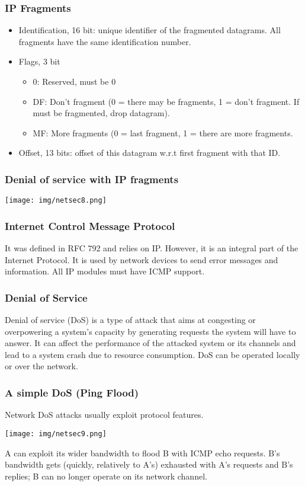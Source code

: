\documentclass[a4paper, 10pt, titlepage]{article}
\begin{document}
\subsubsection*{IP Fragments}
\begin{itemize}
\item Identification, 16 bit: unique identifier of the fragmented
datagrams. All fragments have the same identification number.
\item Flags, 3 bit
\begin{itemize}
\item 0: Reserved, must be 0
\item DF: Don’t fragment (0 = there may be fragments, 1 = don’t fragment. If must be fragmented, drop datagram).
\item MF: More fragments (0 = last fragment, 1 = there are more fragments.
\end{itemize}
\item Offset, 13 bits: offset of this datagram w.r.t first fragment
with that ID.
 \end{itemize}
 
 
\subsubsection{Denial of service with IP fragments}
\begin{center}
	\texttt{[image: img/netsec8.png]}
\end{center}

\subsubsection*{Internet Control Message Protocol}
It was defined in RFC 792 and relies on IP. However, it is an integral part of the Internet Protocol. It is used by network devices to send error messages and information. All IP modules must have ICMP support.

\subsubsection{Denial of Service}
Denial of service (DoS) is a type of attack that aims at congesting or overpowering a system’s capacity by generating requests the system will have to answer. It can affect the performance of the attacked system or its channels and lead to a system crash due to resource consumption. DoS can be operated locally or over the network.

\subsubsection*{A simple DoS (Ping Flood)}
Network DoS attacks usually exploit protocol features.
\begin{center}
	\texttt{[image: img/netsec9.png]}
\end{center}
A can exploit its wider bandwidth to flood B with ICMP echo requests. B’s bandwidth gets (quickly, relatively to A’s) exhausted with A’s requests and B’s replies; B can no longer operate on its network channel.
\end{document}
